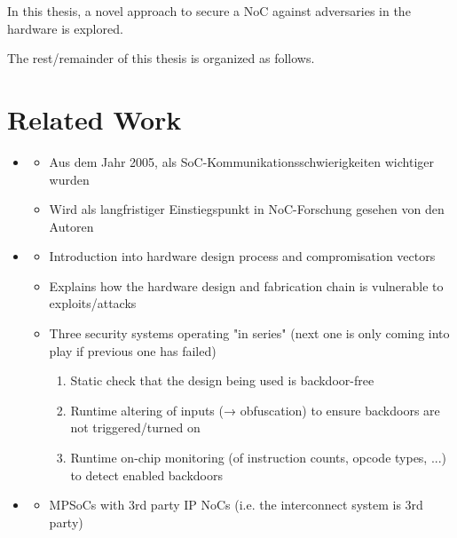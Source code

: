 \documentclass[
	paper=a4,
	fontsize=11pt,
	parskip=full %
]{scrreprt}
\begin{document}
    In this thesis, a novel approach to secure a NoC against adversaries in the hardware is explored.

    The rest/remainder of this thesis is organized as follows.

    \chapter{Related Work} %
    \begin{itemize}
        \item \textbf{}
            \begin{itemize}
                \item Aus dem Jahr 2005, als SoC-Kommunikationsschwierigkeiten wichtiger wurden
                \item Wird als langfristiger Einstiegspunkt in NoC-Forschung gesehen von den Autoren
            \end{itemize}
        \item \textbf{}
            \begin{itemize}
                \item Introduction into hardware design process and compromisation vectors
                \item Explains how the hardware design and fabrication chain is vulnerable to exploits/attacks
                \item Three security systems operating "in series" (next one is only coming into play if previous one has failed)
                    \begin{enumerate}
                        \item Static check that the design being used is backdoor-free
                        \item Runtime altering of inputs (→ obfuscation) to ensure backdoors are not triggered/turned on
                        \item Runtime on-chip monitoring (of instruction counts, opcode types, ...) to detect enabled backdoors
                    \end{enumerate}
            \end{itemize}
        \item \textbf{}
            \begin{itemize}
                \item MPSoCs with 3rd party IP NoCs (i.e. the interconnect system is 3rd party)

\end{itemize}
\end{itemize}
\end{document}
